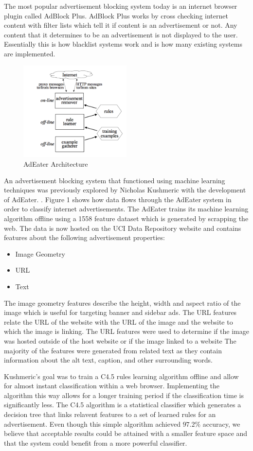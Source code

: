 The most popular advertisement blocking system today is an internet browser plugin called AdBlock Plus. AdBlock Plus works by cross checking internet content with filter lists which tell it if content is an advertisement or not. Any content that it determines to be an advertisement is not displayed to the user\cite{adblock}. Essentially this is how blacklist systems work and is how many existing systems are implemented.

\begin{figure}[h!]
  \caption{AdEater Architecture}
  \label{adeaterimg}
  \centering
    \includegraphics[width=0.5\textwidth]{Figures/adeater.png}
\end{figure}

An advertisement blocking system that functioned using machine learning techniques was previously explored by Nicholas Kushmeric with the development of AdEater. \cite{adeater}. Figure  1 shows how data flows through the AdEater system in order to classify internet advertisements. The AdEater trains its machine learning algorithm offline using a 1558 feature dataset which is generated by scrapping the web. The data is now hosted on the UCI Data Repository website\cite{uci} and contains features about the following advertisement properties:
\begin{itemize}
\item Image Geometry
\item URL
\item Text
\end{itemize}
The image geometry features describe the height, width and aspect ratio of the image which is useful for targeting banner and sidebar ads. The URL features relate the URL of the website with the URL of the image and the website to which the image is linking. The URL features were used to determine if the image was hosted outside of the host website or if the image linked to a website  The majority of the features were generated from related text as they contain information about the alt text, caption, and other surrounding words.  

Kushmeric's goal was to train a C4.5 rules learning algorithm offline and allow for almost  instant classification within a web browser. Implementing the algorithm this way allows for a longer training period if the classification time is significantly less. The C4.5 algorithm is a statistical classifier which generates a decision tree that links relavent features to a set of learned rules for an advertisement. Even though this simple algorithm achieved $97.2\%$ accuracy, we believe that acceptable results could be attained with a smaller feature space and that the system could benefit from a more powerful classifier.

